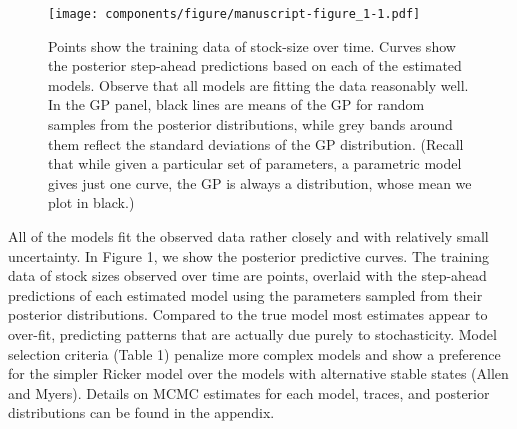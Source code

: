 \documentclass[author-year, 12pt,review]{components/elsarticle} %
\makeatletter
\def\maxwidth{\ifdim\Gin@nat@width>\linewidth\linewidth
\else\Gin@nat@width\fi}
\let\Oldincludegraphics\includegraphics
\renewcommand{\includegraphics}[1]{\Oldincludegraphics[width=\maxwidth]{#1}}
\makeatother
\begin{document}
\begin{figure}[htbp]
\centering
\texttt{[image: components/figure/manuscript-figure\_1-1.pdf]}
\caption{Points show the training data of stock-size over time. Curves
show the posterior step-ahead predictions based on each of the estimated
models. Observe that all models are fitting the data reasonably well. In
the GP panel, black lines are means of the GP for random samples from
the posterior distributions, while grey bands around them reflect the
standard deviations of the GP distribution. (Recall that while given a
particular set of parameters, a parametric model gives just one curve,
the GP is always a distribution, whose mean we plot in black.)}
\end{figure}

All of the models fit the observed data rather closely and with
relatively small uncertainty. In Figure 1, we show the posterior
predictive curves. The training data of stock sizes observed over time
are points, overlaid with the step-ahead predictions of each estimated
model using the parameters sampled from their posterior distributions.
Compared to the true model most estimates appear to over-fit, predicting
patterns that are actually due purely to stochasticity. Model selection
criteria (Table 1) penalize more complex models and show a preference
for the simpler Ricker model over the models with alternative stable
states (Allen and Myers). Details on MCMC estimates for each model,
traces, and posterior distributions can be found in the appendix.
\end{document}
